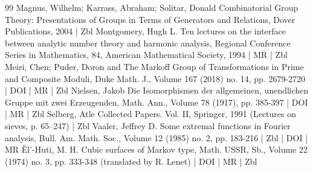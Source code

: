 \begin{thebibliography}{99}
Magnus, Wilhelm; Karrass, Abraham; Solitar, Donald Combinatorial Group Theory: Presentations of Groups in Terms of Generators and Relations, Dover Publications, 2004 | Zbl
Montgomery, Hugh L. Ten lectures on the interface between analytic number theory and harmonic analysis, Regional Conference Series in Mathematics, 84, American Mathematical Society, 1994 | MR | Zbl
Meiri, Chen; Puder, Doron and The Markoff Group of Transformations in Prime and Composite Moduli, Duke Math. J., Volume 167 (2018) no. 14, pp. 2679-2720 | DOI | MR | Zbl
Nielsen, Jakob Die Isomorphismen der allgemeinen, unendlichen Gruppe mit zwei Erzeugenden, Math. Ann., Volume 78 (1917), pp. 385-397 | DOI | MR | Zbl
Selberg, Atle Collected Papers. Vol. II, Springer, 1991 (Lectures on sieves, p. 65–247) | Zbl
Vaaler, Jeffrey D. Some extremal functions in Fourier analysis, Bull. Am. Math. Soc., Volume 12 (1985) no. 2, pp. 183-216 | Zbl | DOI | MR
Èl’-Huti, M. H. Cubic surfaces of Markov type, Math. USSR, Sb., Volume 22 (1974) no. 3, pp. 333-348 (translated by R. Lenet) | DOI | MR | Zbl
\end{thebibliography}

